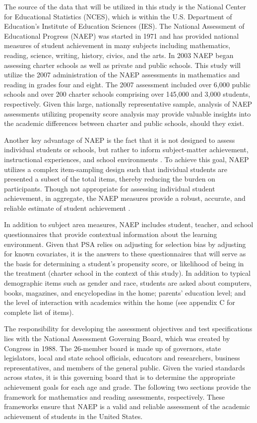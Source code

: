\documentclass[letterpaper,12p,twoside]{article} %
\begin{document}
The source of the data that will be utilized in this study is the National Center for Educational Statistics (NCES), which is within the U.S. Department of Education's Institute of Education Sciences (IES). The National Assessment of Educational Progress (NAEP) was started in 1971 and has provided national measures of student achievement in many subjects including mathematics, reading, science, writing, history, civics, and the arts. In 2003 NAEP began assessing charter schools as well as private and public schools. This study will utilize the 2007 administration of the NAEP assessments in mathematics and reading in grades four and eight. The 2007 assessment included over 6,000 public schools and over 200 charter schools comprising over 145,000 and 3,000 students, respectively. Given this large, nationally representative sample, analysis of NAEP assessments utilizing propensity score analysis may provide valuable insights into the academic differences between charter and public schools, should they exist.

Another key advantage of NAEP is the fact that it is not designed to assess individual students or schools, but rather to inform subject-matter achievement, instructional experiences, and school environments \cite{BraunJenkinsGrigg2006}. To achieve this goal, NAEP utilizes a complex item-sampling design such that individual students are presented a subset of the total items, thereby reducing the burden on participants. Though not appropriate for assessing individual student achievement, in aggregate, the NAEP measures provide a robust, accurate, and reliable estimate of student achievement \cite{DeptOfEd2009}.

In addition to subject area measures, NAEP includes student, teacher, and school questionnaires that provide contextual information about the learning environment. Given that PSA relies on adjusting for selection bias by adjusting for known covariates, it is the answers to these questionnaires that will serve as the basis for determining a student's propensity score, or likelihood of being in the treatment (charter school in the context of this study). In addition to typical demographic items such as gender and race, students are asked about computers, books, magazines, and encyclopedias in the home; parents' education level; and the level of interaction with academics within the home (see appendix C for complete list of items).

The responsibility for developing the assessment objectives and test specifications lies with the National Assessment Governing Board, which was created by Congress in 1988. The 26-member board is made up of governors, state legislators, local and state school officials, educators and researchers, business representatives, and members of the general public. Given the varied standards across states, it is this governing board that is to determine the appropriate achievement goals for each age and grade. The following two sections provide the framework for mathematics and reading assessments, respectively. These frameworks ensure that NAEP is a valid and reliable assessment of the academic achievement of students in the United States.
\end{document}

